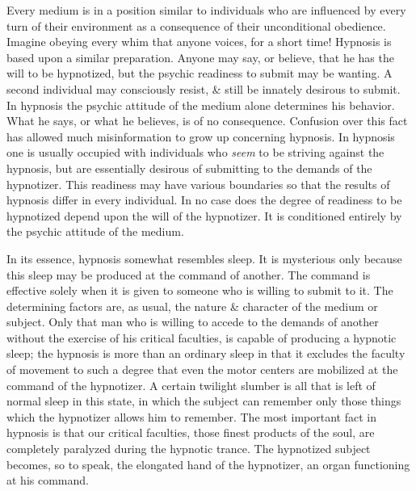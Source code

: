 \documentclass{article}
\begin{document}
Every medium is in a position similar to individuals who are influenced by every turn of their environment as a consequence of their unconditional obedience. Imagine obeying every whim that anyone voices, for a short time! Hypnosis is based upon a similar preparation. Anyone may say, or believe, that he has the will to be hypnotized, but the psychic readiness to submit may be wanting. A second individual may consciously resist, \& still be innately desirous to submit. In hypnosis the psychic attitude of the medium alone determines his behavior. What he says, or what he believes, is of no consequence. Confusion over this fact has allowed much misinformation to grow up concerning hypnosis. In hypnosis one is usually occupied with individuals who {\it seem} to be striving against the hypnosis, but are essentially desirous of submitting to the demands of the hypnotizer. This readiness may have various boundaries so that the results of hypnosis differ in every individual. In no case does the degree of readiness to be hypnotized depend upon the will of the hypnotizer. It is conditioned entirely by the psychic attitude of the medium.

In its essence, hypnosis somewhat resembles sleep. It is mysterious only because this sleep may be produced at the command of another. The command is effective solely when it is given to someone who is willing to submit to it. The determining factors are, as usual, the nature \& character of the medium or subject. Only that man who is willing to accede to the demands of another without the exercise of his critical faculties, is capable of producing a hypnotic sleep; the hypnosis is more than an ordinary sleep in that it excludes the faculty of movement to such a degree that even the motor centers are mobilized at the command of the hypnotizer. A certain twilight slumber is all that is left of normal sleep in this state, in which the subject can remember only those things which the hypnotizer allows him to remember. The most important fact in hypnosis is that our critical faculties, those finest products of the soul, are completely paralyzed during the hypnotic trance. The hypnotized subject becomes, so to speak, the elongated hand of the hypnotizer, an organ functioning at his command.
\end{document}
